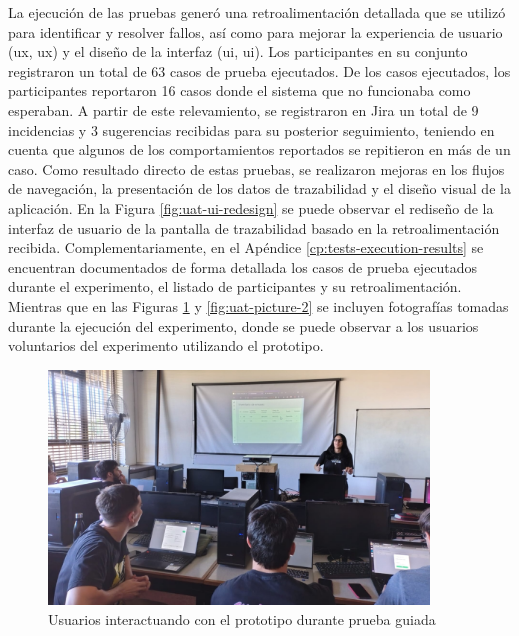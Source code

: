La ejecución de las pruebas generó una retroalimentación detallada que se utilizó para identificar y resolver fallos, así como para mejorar la experiencia de usuario (\acrshort{ux}, \acrlong{ux}) y el diseño de la interfaz (\acrshort{ui}, \acrlong{ui}). Los participantes en su conjunto registraron un total de 63 casos de prueba ejecutados. De los casos ejecutados, los participantes reportaron 16 casos donde el sistema que no funcionaba como esperaban.
A partir de este relevamiento, se registraron en Jira un total de 9 incidencias y 3 sugerencias recibidas para su posterior seguimiento, teniendo en cuenta que algunos de los comportamientos reportados se repitieron en más de un caso. Como resultado directo de estas pruebas, se realizaron mejoras en los flujos de navegación, la presentación de los datos de \gls{trazabilidad} y el diseño visual de la aplicación. En la Figura \ref{fig:uat-ui-redesign} se puede observar el rediseño de la interfaz de usuario de la pantalla de trazabilidad basado en la retroalimentación recibida. Complementariamente, en el Apéndice \ref{cp:tests-execution-results} se encuentran documentados de forma detallada los casos de prueba ejecutados durante el experimento, el listado de participantes y su retroalimentación. Mientras que en las Figuras \ref{fig:uat-picture-1} y \ref{fig:uat-picture-2} se incluyen fotografías tomadas durante la ejecución del experimento, donde se puede observar a los usuarios voluntarios del experimento utilizando el prototipo.

\begin{figure}[!htb]
\centering
\includegraphics[width=0.9\textwidth]{Figures/uat-1.jpg}
\caption{Usuarios interactuando con el prototipo durante prueba guiada}
\label{fig:uat-picture-1}
\end{figure}

